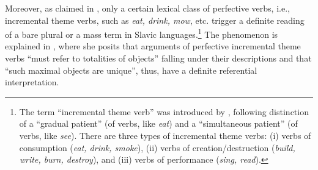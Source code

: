 \documentclass[output=paper,
colorlinks,
citecolor=brown,
newtxmath
]{langscibook}
\begin{document}
Moreover, as claimed in \citet{Czardybon2017}, %
only a certain lexical class of perfective verbs, i.e., incremental theme verbs, such as \textit{eat, drink, mow}, etc.
trigger a definite reading of a bare plural or a mass term in Slavic languages.\footnote{The term ``incremental theme verb'' was introduced by \citet{Dowty1991}, following  distinction of a ``gradual patient'' (of verbs, like \textit{eat}) and a ``simultaneous patient'' (of verbs, like \textit{see}). There are three types of incremental theme verbs: (i) verbs of consumption (\textit{eat, drink, smoke}), (ii) verbs of creation/destruction (\textit{build, write, burn, destroy}), and (iii) verbs of performance (\textit{sing, read}).} The phenomenon is explained in \citet[134--136]{Filip2005}, where she posits that arguments of perfective incremental theme verbs ``must refer to totalities of objects'' falling under their descriptions and that ``such maximal objects are unique'', thus, have a definite referential interpretation.
\end{document}
